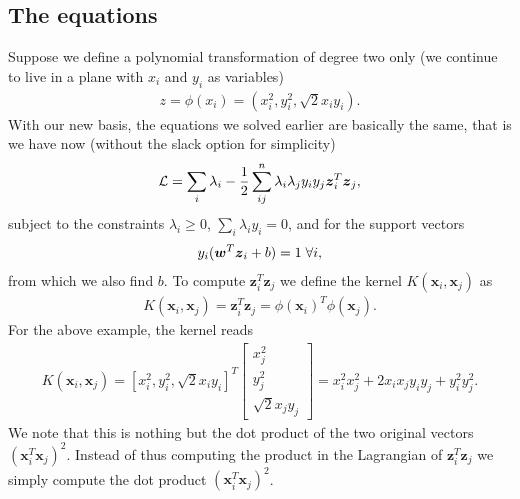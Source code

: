 \documentclass[letterpaper,10pt,english]{sphinxmanual}
\begin{document}
\noindent{}


\subsection{The equations}
\label{\detokenize{chapter7:the-equations}}
Suppose we define a polynomial transformation of degree two only (we continue to live in a plane with \(x_i\) and \(y_i\) as variables)
\begin{equation*}
\begin{split}
z = \phi(x_i) =\left(x_i^2, y_i^2, \sqrt{2}x_iy_i\right).
\end{split}
\end{equation*}
With our new basis, the equations we solved earlier are basically the same, that is we have now (without the slack option for simplicity)
\begin{equation*}
\begin{split}
{\cal L}=\sum_i\lambda_i-\frac{1}{2}\sum_{ij}^n\lambda_i\lambda_jy_iy_j\boldsymbol{z}_i^T\boldsymbol{z}_j,
\end{split}
\end{equation*}
subject to the constraints \(\lambda_i\geq 0\), \(\sum_i\lambda_iy_i=0\), and for the support vectors
\begin{equation*}
\begin{split}
y_i(\boldsymbol{w}^T\boldsymbol{z}_i+b)= 1 \hspace{0.1cm}\forall i,
\end{split}
\end{equation*}
from which we also find \(b\).
To compute \(\boldsymbol{z}_i^T\boldsymbol{z}_j\) we define the kernel \(K(\boldsymbol{x}_i,\boldsymbol{x}_j)\) as
\begin{equation*}
\begin{split}
K(\boldsymbol{x}_i,\boldsymbol{x}_j)=\boldsymbol{z}_i^T\boldsymbol{z}_j= \phi(\boldsymbol{x}_i)^T\phi(\boldsymbol{x}_j).
\end{split}
\end{equation*}
For the above example, the kernel reads
\begin{equation*}
\begin{split}
K(\boldsymbol{x}_i,\boldsymbol{x}_j)=[x_i^2, y_i^2, \sqrt{2}x_iy_i]^T\begin{bmatrix} x_j^2 \\ y_j^2 \\ \sqrt{2}x_jy_j \end{bmatrix}=x_i^2x_j^2+2x_ix_jy_iy_j+y_i^2y_j^2.
\end{split}
\end{equation*}
We note that this is nothing but the dot product of the two original
vectors \((\boldsymbol{x}_i^T\boldsymbol{x}_j)^2\). Instead of thus computing the
product in the Lagrangian of \(\boldsymbol{z}_i^T\boldsymbol{z}_j\) we simply compute
the dot product \((\boldsymbol{x}_i^T\boldsymbol{x}_j)^2\).
\end{document}
